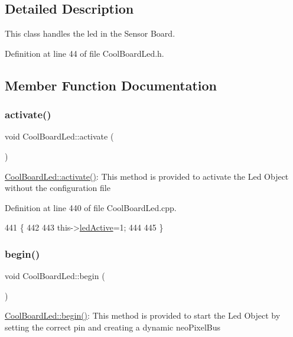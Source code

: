 \subsection{Detailed Description}
This class handles the led in the Sensor Board. 

Definition at line 44 of file Cool\+Board\+Led.\+h.



\subsection{Member Function Documentation}
\mbox{\label{class_cool_board_led_ae74fe4b47d06c3a97b468ba220c4eb99}} 
\subsubsection{\texorpdfstring{activate()}{activate()}}
{\footnotesize\ttfamily void Cool\+Board\+Led\+::activate (\begin{DoxyParamCaption}{ }\end{DoxyParamCaption})}

\hyperlink{class_cool_board_led_ae74fe4b47d06c3a97b468ba220c4eb99}{Cool\+Board\+Led\+::activate()}\+: This method is provided to activate the Led Object without the configuration file 

Definition at line 440 of file Cool\+Board\+Led.\+cpp.


\begin{DoxyCode}
441 \{
442 
443     this->\hyperlink{class_cool_board_led_aadd04d2ecf123247718d77f42fba7f08}{ledActive}=1;
444 
445 \}
\end{DoxyCode}
\mbox{\label{class_cool_board_led_ae3cbde8affcc6f011cbd698c8ef911f6}} 
\subsubsection{\texorpdfstring{begin()}{begin()}}
{\footnotesize\ttfamily void Cool\+Board\+Led\+::begin (\begin{DoxyParamCaption}{ }\end{DoxyParamCaption})}

\hyperlink{class_cool_board_led_ae3cbde8affcc6f011cbd698c8ef911f6}{Cool\+Board\+Led\+::begin()}\+: This method is provided to start the Led Object by setting the correct pin and creating a dynamic neo\+Pixel\+Bus 

